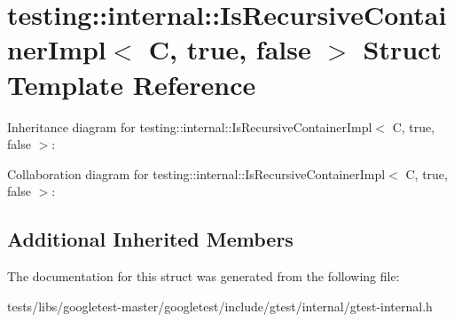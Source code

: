 \hypertarget{structtesting_1_1internal_1_1IsRecursiveContainerImpl_3_01C_00_01true_00_01false_01_4}{}\section{testing\+:\+:internal\+:\+:Is\+Recursive\+Container\+Impl$<$ C, true, false $>$ Struct Template Reference}
\label{structtesting_1_1internal_1_1IsRecursiveContainerImpl_3_01C_00_01true_00_01false_01_4}


Inheritance diagram for testing\+:\+:internal\+:\+:Is\+Recursive\+Container\+Impl$<$ C, true, false $>$\+:


Collaboration diagram for testing\+:\+:internal\+:\+:Is\+Recursive\+Container\+Impl$<$ C, true, false $>$\+:
\subsection*{Additional Inherited Members}


The documentation for this struct was generated from the following file\+:\begin{DoxyCompactItemize}
\item 
tests/libs/googletest-\/master/googletest/include/gtest/internal/gtest-\/internal.\+h\end{DoxyCompactItemize}
